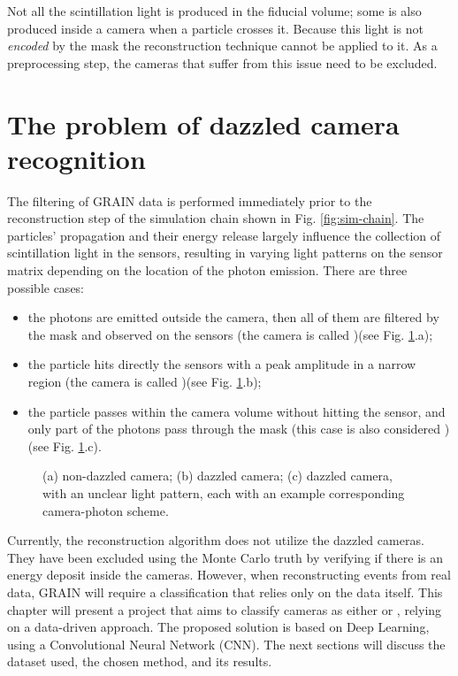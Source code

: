 \label{ML-chapter}
Not all the scintillation light is produced in the fiducial volume; some is also produced inside a camera when a particle crosses it. Because this light is not \emph{encoded} by the mask the reconstruction technique cannot be applied to it. As a preprocessing step, the cameras that suffer from this issue need to be excluded.

\section{The problem of dazzled camera recognition}
\label{ML-intro}
The filtering of GRAIN data is performed immediately prior to the reconstruction step of the simulation chain shown in Fig. \ref{fig:sim-chain}. The particles' propagation and their energy release largely influence the collection of scintillation light in the sensors, resulting in varying light patterns on the sensor matrix depending on the location of the photon emission. 
There are three possible cases: 
\begin{itemize} 
    \item the photons are emitted outside the camera, then all of them are filtered by the mask and observed on the sensors (the camera is called )(see Fig. \ref{fig:cam_cases}.a);
    \item the particle hits directly the sensors with a peak amplitude in a narrow region (the camera is called )(see Fig. \ref{fig:cam_cases}.b);
    \item the particle passes within the camera volume without hitting the sensor, and only part of the photons pass through the mask (this case is also considered ) (see Fig. \ref{fig:cam_cases}.c). 
\end{itemize}

\begin{figure}
    \centering
    \hfil
    \hfil
    \caption{(a) non-dazzled camera; (b) dazzled camera; (c) dazzled camera, with an unclear light pattern, each with an example corresponding camera-photon scheme.}
    \label{fig:cam_cases}
\end{figure}

Currently, the reconstruction algorithm does not utilize the dazzled cameras. They have been excluded using the Monte Carlo truth by verifying if there is an energy deposit inside the cameras. However, when reconstructing events from real data, GRAIN will require a classification that relies only on the data itself.
This chapter will present a project that aims to classify cameras as either  or , relying on a data-driven approach. The proposed solution is based on Deep Learning, using a Convolutional Neural Network (CNN). The next sections will discuss the dataset used, the chosen method, and its results. 

